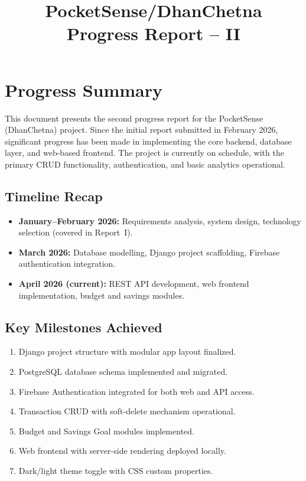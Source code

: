 \documentclass[12pt,a4paper]{article}
\title{\textbf{PocketSense/DhanChetna} \\ \large Progress Report -- II}
\author{}
\date{}
\begin{document}
\maketitle
\tableofcontents
\newpage

\section{Progress Summary}

This document presents the second progress report for the PocketSense (DhanChetna) project.
Since the initial report submitted in February 2026, significant progress has been made in implementing the core backend, database layer, and web-based frontend.
The project is currently on schedule, with the primary CRUD functionality, authentication, and basic analytics operational.

\subsection{Timeline Recap}
\begin{itemize}
  \item \textbf{January--February 2026:} Requirements analysis, system design, technology selection (covered in Report~I).
  \item \textbf{March 2026:} Database modelling, Django project scaffolding, Firebase authentication integration.
  \item \textbf{April 2026 (current):} REST API development, web frontend implementation, budget and savings modules.
\end{itemize}

\subsection{Key Milestones Achieved}
\begin{enumerate}
  \item Django project structure with modular app layout finalized.
  \item PostgreSQL database schema implemented and migrated.
  \item Firebase Authentication integrated for both web and API access.
  \item Transaction CRUD with soft-delete mechanism operational.
  \item Budget and Savings Goal modules implemented.
  \item Web frontend with server-side rendering deployed locally.
  \item Dark/light theme toggle with CSS custom properties.
\end{enumerate}
\end{document}
